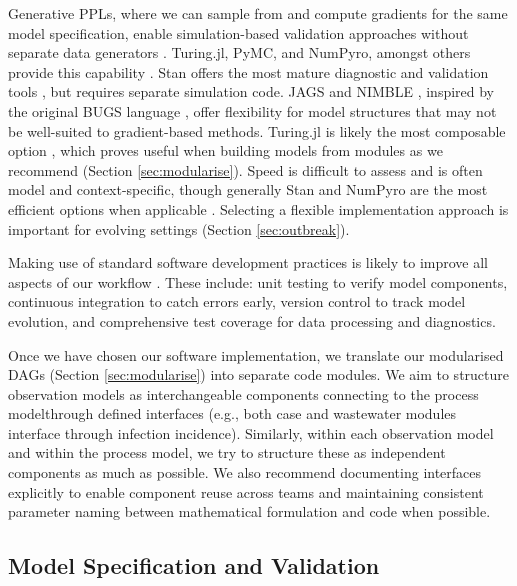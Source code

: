\documentclass{article}
\begin{document}
Generative \ac{PPL}s, where we can sample from and compute gradients for the same model specification, enable simulation-based validation approaches without separate data generators  \citet{vstrumbelj2024past}.
Turing.jl, PyMC, and NumPyro, amongst others provide this capability \citep{ge2018turing,fjelde2025turing,abril2023pymc,phan2019composable}.
Stan offers the most mature diagnostic and validation tools \citep{carpenter2017stan}, but requires separate simulation code.
JAGS and NIMBLE \citep{plummer2003jags,de2017programming}, inspired by the original BUGS language \citep{lunn2013bugs}, offer flexibility for model structures that may not be well-suited to gradient-based methods.
Turing.jl is likely the most composable option \citep{ge2018turing}, which proves useful when building models from modules as we recommend (Section \ref{sec:modularise}).
Speed is difficult to assess and is often model and context-specific, though generally Stan and NumPyro are the most efficient options when applicable \citep{carpenter2017stan,phan2019composable}.
Selecting a flexible implementation approach is important for evolving settings (Section \ref{sec:outbreak}).

Making use of standard software development practices is likely to improve all aspects of our workflow \citep{gelman2020bayesian}.
These include: unit testing to verify model components, continuous integration to catch errors early, version control to track model evolution, and comprehensive test coverage for data processing and diagnostics.


Once we have chosen our software implementation, we translate our modularised \ac{DAG}s (Section \ref{sec:modularise}) into separate code modules.
We aim to structure observation models as interchangeable components connecting to the process modelthrough defined interfaces (e.g., both case and wastewater modules interface through infection incidence). Similarly, within each observation model and within the process model, we try to structure these as independent components as much as possible. We also recommend documenting interfaces explicitly to enable component reuse across teams and maintaining consistent parameter naming between mathematical formulation and code when possible.

\subsection{Model Specification and Validation}\label{sec:spec-validate}
\end{document}
